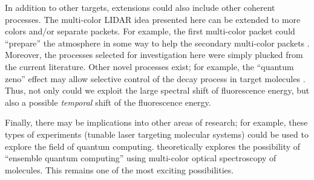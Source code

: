 In addition to other targets, extensions could also include other coherent processes. The multi-color LIDAR idea presented here can be extended to more colors and/or separate packets. For example, the first multi-color packet could ``prepare'' the atmosphere in some way to help the secondary multi-color packets \cite{Mccall:1969a,Eberly:1998a,Scully:2001a,Oreg:1984a,Grobe:1994a}. Moreover, the processes selected for investigation here were simply plucked from the current literature. Other novel processes exist; for example, the ``quantum zeno'' effect \cite{Home:1997,Spreeuw:1997a} may allow selective control of the decay process in target molecules \cite{Itano:1990a}. Thus, not only could we exploit the large spectral shift of fluorescence energy, but also a possible \emph{temporal} shift of the fluorescence energy.

Finally, there may be implications into other areas of research; for example, these types of experiments (tunable laser targeting molecular systems) could be used to explore the field of quantum computing. \cite{Goswami:2002a} theoretically explores the possibility of ``ensemble quantum computing'' using multi-color optical spectroscopy of molecules. This remains one of the most exciting possibilities.
